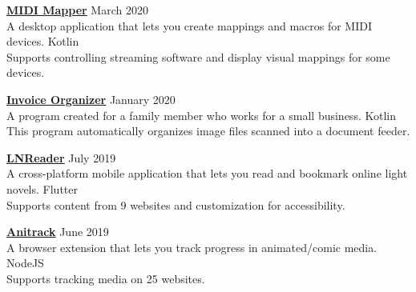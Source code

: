 \documentclass[a4paper]{article}
\begin{document}
{\textbf{\href{https://github.com/TSedlar/MIDI-Mapper}{\ul{MIDI Mapper}}}} \hfill March 2020 \\
\vspace{1mm}
A desktop application that lets you create mappings and macros for MIDI devices. \hfill Kotlin \\ 
Supports controlling streaming software and display visual mappings for some devices. \\
\vspace*{1mm}

{\textbf{\href{https://github.com/TSedlar/InvoiceOrganizer}{\ul{Invoice Organizer}}}} \hfill January 2020 \\
\vspace{1mm}
A program created for a family member who works for a small business. \hfill Kotlin \\ 
This program automatically organizes image files scanned into a document feeder. \\
\vspace*{1mm}

{\textbf{\href{https://sedlar.me/lnreader}{\ul{LNReader}}}} \hfill July 2019 \\
\vspace*{1mm}
A cross-platform mobile application that lets you read and bookmark online light novels. \hfill Flutter \\
Supports content from 9 websites and customization for accessibility.
\vspace*{1mm}

{\textbf{\href{https://github.com/TSedlar/anitrack}{\ul{Anitrack}}}} \hfill June 2019 \\
\vspace*{1mm}
A browser extension that lets you track progress in animated/comic media. \hfill NodeJS \\
Supports tracking media on 25 websites.
\vspace*{1mm}

\vspace*{2mm}
\end{document}
